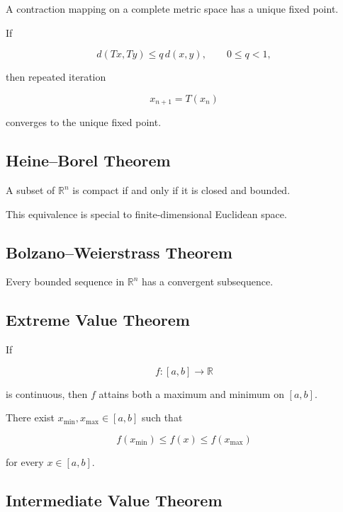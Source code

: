 A contraction mapping on a complete metric space has a unique fixed point.

If

\[
d(Tx,Ty)
\leq
q\,d(x,y),
\qquad
0\leq q<1,
\]

then repeated iteration

\[
x_{n+1}=T(x_n)
\]

converges to the unique fixed point.

\subsection{Heine--Borel Theorem}
\label{subsec:heine-borel-summary}

A subset of \(\mathbb{R}^n\) is compact if and only if it is closed and
bounded.

This equivalence is special to finite-dimensional Euclidean space.

\subsection{Bolzano--Weierstrass Theorem}
\label{subsec:bolzano-weierstrass-summary}

Every bounded sequence in \(\mathbb{R}^n\) has a convergent subsequence.

\subsection{Extreme Value Theorem}
\label{subsec:extreme-value-theorem-summary}

If

\[
f:[a,b]\to\mathbb{R}
\]

is continuous, then \(f\) attains both a maximum and minimum on \([a,b]\).

There exist \(x_{\min},x_{\max}\in[a,b]\) such that

\[
\boxed{
f(x_{\min})
\leq
f(x)
\leq
f(x_{\max})
}
\]

for every \(x\in[a,b]\).

\subsection{Intermediate Value Theorem}
\label{subsec:intermediate-value-summary}

